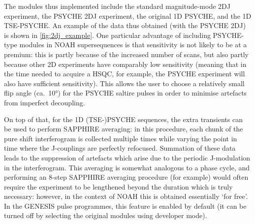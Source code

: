 The modules thus implemented include the standard magnitude-mode 2DJ experiment, the PSYCHE 2DJ experiment\autocite{Foroozandeh2015CC}, the original 1D PSYCHE\autocite{Foroozandeh2014ACIE}, and the 1D TSE-PSYCHE\autocite{Foroozandeh2015CC}.
An example of the data thus obtained (with the PSYCHE 2DJ) is shown in \cref{fig:2dj_example}.
One particular advantage of including PSYCHE-type modules in NOAH supersequences is that sensitivity is not likely to be at a premium: this is partly because of the increased number of scans, but also partly because other 2D experiments have comparably low sensitivity (meaning that in the time needed to acquire a HSQC, for example, the PSYCHE experiment will also have sufficient sensitivity).
This allows the user to choose a relatively small flip angle (ca.\ \ang{10}) for the PSYCHE saltire pulses in order to minimise artefacts from imperfect decoupling.

On top of that, for the 1D (TSE-)PSYCHE sequences, the extra transients can be used to perform SAPPHIRE averaging\autocite{Moutzouri2017CC}: in this procedure, each chunk of the pure shift interferogram is collected multiple times while varying the point in time where the J-couplings are perfectly refocused.
Summation of these data leads to the suppression of artefacts which arise due to the periodic J-modulation in the interferogram.
This averaging is somewhat analogous to a phase cycle, and performing an 8-step SAPPHIRE averaging procedure (for example) would often require the experiment to be lengthened beyond the duration which is truly necessary: however, in the context of NOAH this is obtained essentially `for free'.
In the GENESIS pulse programmes, this feature is enabled by default (it can be turned off by selecting the original modules using developer mode).

